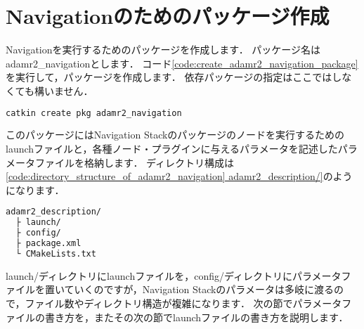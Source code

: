 \documentclass[{../../master}]{subfiles}
\begin{document}
\section{Navigationのためのパッケージ作成}

Navigationを実行するためのパッケージを作成します．
パッケージ名は\textsf{adamr2\_navigation}とします．
コード\ref{code:create_adamr2_navigation_package}を実行して，パッケージを作成します．
依存パッケージの指定はここではしなくても構いません．

\begin{lstlisting}[language=sh, label=code:create_adamr2_navigation_package, caption=Create \textsf{adamr2\_navigation} Package]
catkin create pkg adamr2_navigation
\end{lstlisting}

このパッケージにはNavigation Stackのパッケージのノードを実行するためのlaunchファイルと，各種ノード・プラグインに与えるパラメータを記述したパラメータファイルを格納します．
ディレクトリ構成は\ref{code:directory_structure_of_adamr2_navigation]
adamr2_description/}のようになります．

\begin{lstlisting}[language=sh, caption=Directory Structure of \textsf{adamr2\_navigation}, label=code;directory_structure_of_adamr2_navigation]
adamr2_description/
  ├ launch/
  ├ config/
  ├ package.xml
  └ CMakeLists.txt
\end{lstlisting}

\textsf{launch/}ディレクトリにlaunchファイルを，\textsf{config/}ディレクトリにパラメータファイルを置いていくのですが，Navigation Stackのパラメータは多岐に渡るので，ファイル数やディレクトリ構造が複雑になります．
次の節でパラメータファイルの書き方を，またその次の節でlaunchファイルの書き方を説明します．
\end{document}
